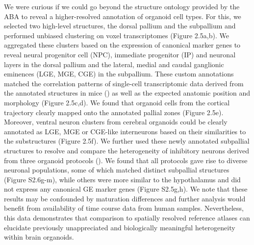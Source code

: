 We were curious if we could go beyond the structure ontology provided by the ABA to reveal a higher-resolved annotation of organoid cell types. For this, we selected two high-level structures, the dorsal pallium and the subpallium and performed unbiased clustering on voxel transcriptomes (Figure 2.5a,b). We aggregated these clusters based on the expression of canonical marker genes to reveal neural progenitor cell (NPC), immediate progenitor (IP) and neuronal layers in the dorsal pallium and the lateral, medial and caudal ganglionic eminences (LGE, MGE, CGE) in the subpallium. These custom annotations matched the correlation patterns of single-cell transcriptomic data derived from the annotated structures in mice (\cite{loo_single-cell_2019,mayer_developmental_2018}) as well as the expected anatomic position and morphology (Figure 2.5c,d). We found that organoid cells from the cortical trajectory clearly mapped onto the annotated pallial zones (Figure 2.5e). Moreover, ventral neuron clusters from cerebral organoids could be clearly annotated as LGE, MGE or CGE-like interneurons based on their similarities to the substructures (Figure 2.5f). We further used these newly annotated subpallial structures to resolve and compare the heterogeneity of inhibitory neurons derived from three organoid protocols (\cite{birey_assembly_2017,kanton_organoid_2019,xiang_hesc-derived_2019}). We found that all protocols gave rise to diverse neuronal populations, some of which matched distinct subpallial structures (Figure S2.6g-m), while others were more similar to the hypothalamus and did not express any canonical GE marker genes (Figure S2.5g,h). We note that these results may be confounded by maturation differences and further analysis would benefit from availability of time course data from human samples. Nevertheless, this data demonstrates that comparison to spatially resolved reference atlases can elucidate previously unappreciated and biologically meaningful heterogeneity within brain organoids.

